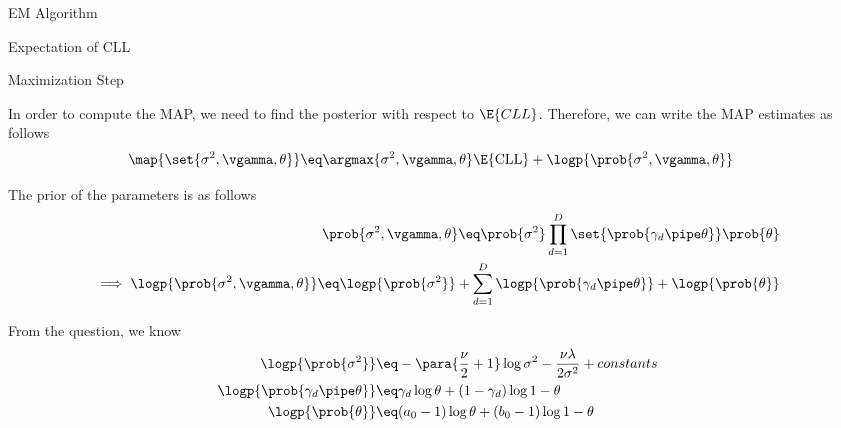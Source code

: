 \documentclass{article}
\begin{document}
\begin{question}
\begin{qsection}{EM Algorithm}
\begin{qsubsection}{Expectation of CLL}
		\end{qsubsection}

		\begin{qsubsection}{Maximization Step}

			In order to compute the MAP, we need to find the posterior with respect to $\E{CLL}$. Therefore, we can write the MAP estimates as follows
			\begin{align*}
				\map{\set{\sigma^2, \vgamma, \theta}}	&\eq	\argmax{\sigma^2, \vgamma, \theta} \E{\text{CLL}} + \logp{\prob{\sigma^2, \vgamma, \theta}}
			\end{align*}


			The prior of the parameters is as follows
			\begin{align*}
				\prob{\sigma^2, \vgamma, \theta}	\eq	\prob{\sigma^2} \prod_{d = 1}^D \set{\prob{\gamma_d \pipe \theta}} \prob{\theta} \\
				\implies \logp{\prob{\sigma^2, \vgamma, \theta}}	\eq	\logp{\prob{\sigma^2}} + \sum_{d = 1}^D \logp{\prob{\gamma_d \pipe \theta}} + \logp{\prob{\theta}}
			\end{align*}

			From the question, we know
			\begin{align*}
				\logp{\prob{\sigma^2}}				&\eq	- \para{\frac{\nu}{2} + 1} \log{\sigma^2} - \frac{\nu \lambda}{2 \sigma^2} + constants \\
				\logp{\prob{\gamma_d \pipe \theta}}	&\eq	\gamma_d \log{\theta} + (1 - \gamma_d) \log{1 - \theta} \\
				\logp{\prob{\theta}}				&\eq	(a_0 - 1) \log{\theta} + (b_0 - 1) \log{1 - \theta}
			\end{align*}


\end{qsubsection}
\end{qsection}
\end{question}
\end{document}
